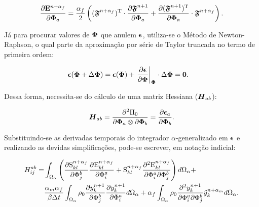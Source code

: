 \begin{equation}
    \frac{\partial{\mathbf{E}^{n+\alpha_f}}}{\partial{\boldsymbol{\Phi}_a}}=\frac{\alpha_f}{2}\left({(\boldsymbol{\mathfrak{F}}^{n+\alpha_f})^\mathrm{T}\cdot\frac{\partial{\boldsymbol{\mathfrak{F}}^{n+1}}}{\partial{\boldsymbol{\Phi}_a}}+\frac{\partial{(\boldsymbol{\mathfrak{F}}^{n+1})^\mathrm{T}}}{\partial{\boldsymbol{\Phi}_a}}\cdot\boldsymbol{\mathfrak{F}}^{n+\alpha_f}}\right)\text{.}
\end{equation}

Já para procurar valores de $\boldsymbol{\Phi}$ que anulem $\boldsymbol{\epsilon}$, utiliza-se o Método de Newton-Raphson, o qual parte da aproximação por série de Taylor truncada no termo de primeira ordem:

\begin{equation}
    \begin{split}
        &\boldsymbol{\epsilon}(\boldsymbol{\Phi}+\Delta\boldsymbol{\Phi})=\boldsymbol{\epsilon}(\boldsymbol{\Phi})+\left.\frac{\partial{\boldsymbol{\epsilon}}}{\partial{\boldsymbol{\Phi}}}\right|_{\boldsymbol{\boldsymbol{\Phi}}}\cdot\Delta\boldsymbol{\Phi}=\boldsymbol{0}\text{.}
    \end{split}
\end{equation}

\noindent Dessa forma, necessita-se do cálculo de uma matriz Hessiana ($\boldsymbol{H}_{ab}$):

\begin{equation}
    \boldsymbol{H}_{ab}=\frac{\partial^2\Pi_0}{\partial\boldsymbol{\Phi}_a\otimes\partial\boldsymbol{\Phi}_b}=\frac{\partial{\boldsymbol{\epsilon}_a}}{\partial{\boldsymbol{\Phi}_b}}\text{.}
\end{equation}

Substituindo-se as derivadas temporais do integrador $\alpha$-generalizado em $\boldsymbol{\epsilon}$ e realizando as devidas simplificações, pode-se escrever, em notação indicial:

\begin{equation}
    \begin{split}
        H_{ij}^{ab}=&\intDoma{\bigpar{\der{\mathrm{S}^{n+\alpha_f}_{kl}}{\Phi_j^b}\der{\mathrm{E}^{n+\alpha_f}_{kl}}{\Phi_i^a}+\mathrm{S}^{n+\alpha_f}_{kl}\Dder{\mathrm{E}^{n+\alpha_f}_{kl}}{\Phi_i^a}{\Phi_j^b}}}+\\
        &\frac{\alpha_m\alpha_f}{\beta\Delta t}\intDoma{\rho_0\der{y_k^{n+1}}{\Phi_j^b}\der{y_k^{n+1}}{\Phi_i^a}}+\alpha_f\intDoma{\rho_0\Dder{y_k^{n+1}}{\Phi_i^a}{\Phi_j^b}\ddot{y}_k^{n+\alpha_m}}\text{.}
    \end{split}
    \label{eq:CSD-Hijab}
\end{equation}

%

